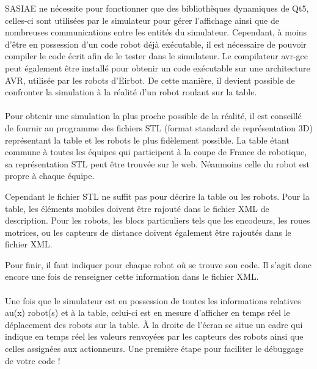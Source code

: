 SASIAE ne nécessite pour fonctionner que des bibliothèques dynamiques de Qt5, celles-ci sont utilisées par le simulateur pour gérer l'affichage ainsi que de nombreuses communications entre les entités du simulateur. Cependant, à moins d'être en possession d'un code robot déjà exécutable, il est nécessaire de pouvoir compiler le code écrit afin de le tester dans le simulateur. Le compilateur avr-gcc peut également être installé pour obtenir un code exécutable sur une architecture AVR, utilisée par les robots d'Eirbot. De cette manière, il devient possible de confronter la simulation à la réalité d'un robot roulant sur la table.

\paragraph{}
Pour obtenir une simulation la plus proche possible de la réalité, il est conseillé de fournir au programme des fichiers STL (format standard de représentation 3D) représentant la table et les robots le plus fidèlement possible. La table étant commune à toutes les équipes qui participent à la coupe de France de robotique, sa représentation STL peut être trouvée sur le web. Néanmoins celle du robot est propre à chaque équipe.

Cependant le fichier STL ne suffit pas pour décrire la table ou les robots. Pour la table, les éléments mobiles doivent être rajouté dans le fichier XML de description. Pour les robots, les blocs particuliers tels que les encodeurs, les roues motrices, ou les capteurs de distance doivent également être rajoutés dans le fichier XML.

Pour finir, il faut indiquer pour chaque robot où se trouve son code. Il s'agit donc encore une fois de renseigner cette information dans le fichier XML.

\paragraph{}
Une fois que le simulateur est en possession de toutes les informations relatives au(x) robot(s) et à la table, celui-ci est en mesure d'afficher en temps réel le déplacement des robots sur la table. À la droite de l'écran se situe un cadre qui indique en temps réel les valeurs renvoyées par les capteurs des robots ainsi que celles assignées aux actionneurs. Une première étape pour faciliter le débuggage de votre code !